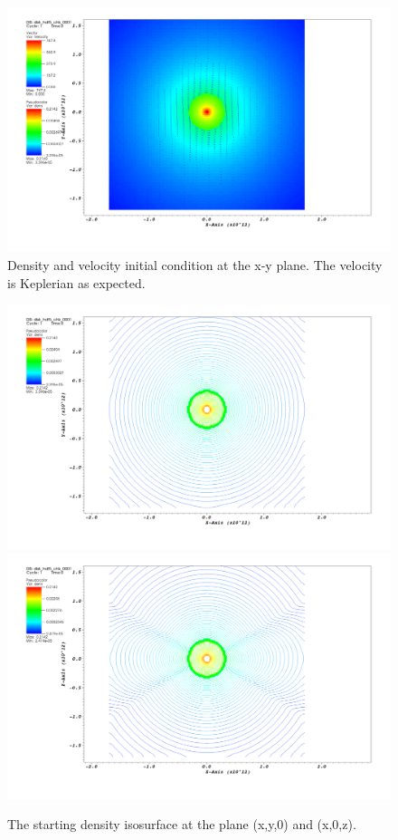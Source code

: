 \documentclass[12pt, a4paper]{article}
\begin{document}
\begin{figure}[ht!]
    \begin{center}
        \includegraphics[width=1.0\textwidth]{density-vel-x-y.png}
    \end{center}
    \caption{
        Density and velocity initial condition at the x-y plane. The velocity is Keplerian as expected. 
    }\label{fig:dens-vel-xy-t0}
\end{figure}
\begin{figure}[ht!]
    \begin{center}
        \includegraphics[width=1.0\textwidth]{density-x-y-isosurf-t0.png}
        \includegraphics[width=1.0\textwidth]{density-x-z-isosurf-t0.png}
    \end{center}
    \caption{
        The starting density isosurface at the plane (x,y,0) and (x,0,z). 
    }\label{fig:dens-xy-t0}
\end{figure}
\end{document}
